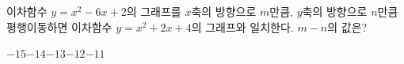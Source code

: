 이차함수 $y=x^2-6x+2$의 그래프를 $x$축의 방향으로 $m$만큼, $y$축의 방향으로 $n$만큼 평행이동하면 이차함수 $y=x^2+2x+4$의 그래프와 일치한다. $m-n$의 값은?
\begin{choices32}{$-15$}{$-14$}{$-13$}{$-12$}{$-11$}\end{choices32}
